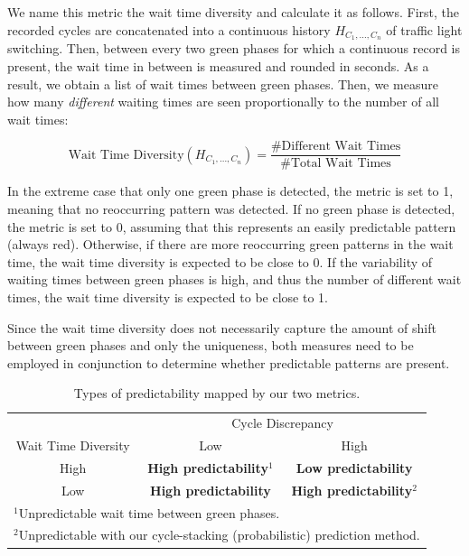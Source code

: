 We name this metric the wait time diversity and calculate it as follows. First, the recorded cycles are concatenated into a continuous history $H_{C_1, \dots, C_n}$ of traffic light switching. Then, between every two green phases for which a continuous record is present, the wait time in between is measured and rounded in seconds. As a result, we obtain a list of wait times between green phases. Then, we measure how many \textit{different} waiting times are seen proportionally to the number of all wait times:

\begin{equation}
\text{Wait Time Diversity}(H_{C_1, \dots, C_n}) = \frac{\text{\# Different Wait Times}}{\text{\# Total Wait Times}}
\end{equation}

In the extreme case that only one green phase is detected, the metric is set to 1, meaning that no reoccurring pattern was detected. If no green phase is detected, the metric is set to 0, assuming that this represents an easily predictable pattern (always red). Otherwise, if there are more reoccurring green patterns in the wait time, the wait time diversity is expected to be close to 0. If the variability of waiting times between green phases is high, and thus the number of different wait times, the wait time diversity is expected to be close to 1.

Since the wait time diversity does not necessarily capture the amount of shift between green phases and only the uniqueness, both measures need to be employed in conjunction to determine whether predictable patterns are present.

\begin{table}[t]
\centering
\def\arraystretch{1.5}
\caption{Types of predictability mapped by our two metrics.}
\label{tab:cases}
\begin{tabular}{c|c|c|}
\multicolumn{1}{c}{} & \multicolumn{2}{c}{Cycle Discrepancy} \\
\cline{2-3}
Wait Time Diversity& Low& High\\
\hline
\multicolumn{1}{|c|}{High}& \textbf{\color{good} High predictability}$^1$& \textbf{\color{bad} Low predictability} \\
\hline
\multicolumn{1}{|c|}{Low}& \textbf{\color{good} High predictability}& \textbf{\color{good} High predictability}$^2$\\
\hline
\multicolumn{3}{l}{$^1$\footnotesize{Unpredictable wait time between green phases.}} \\
\multicolumn{3}{l}{$^2$\footnotesize{Unpredictable with our cycle-stacking (probabilistic) prediction method.}}
\end{tabular}
\end{table}

